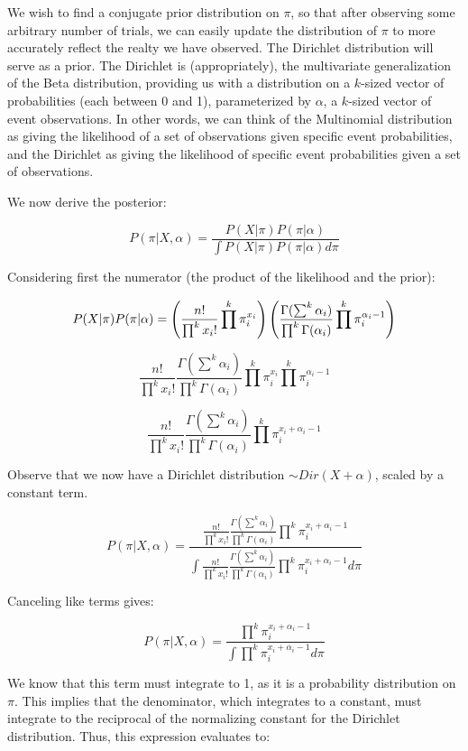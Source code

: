 \documentclass[twoside,11pt]{homework}
\begin{document}
We wish to find a conjugate prior distribution on $\pi$, so that after observing some arbitrary number of trials, we can easily update the distribution of $\pi$ to more accurately reflect the realty we have observed. The Dirichlet distribution will serve as a prior. The Dirichlet is (appropriately), the multivariate generalization of the Beta distribution, providing us with a distribution on a $k$-sized vector of probabilities (each between 0 and 1), parameterized by $\alpha$, a $k$-sized vector of event observations. In other words, we can think of the Multinomial distribution as giving the likelihood of a set of observations given specific event probabilities, and the Dirichlet as giving the likelihood of specific event probabilities given a set of observations.

We now derive the posterior:

\[
P(\pi | X, \alpha) = \frac{P(X|\pi)P(\pi|\alpha)}{\int P(X|\pi)P(\pi|\alpha) d\pi}
\]

Considering first the numerator (the product of the likelihood and the prior):

\[
P(X|\pi)P(\pi|\alpha) = \left(\frac{n!}{\prod^k x_i!}\prod^k \pi_i^{x_i}\right)\left(\frac{\Gamma(\sum^k \alpha_i)}{\prod^k \Gamma(\alpha_i)}\prod^k \pi_i^{\alpha_i - 1}\right)
\]

\[
\frac{n!}{\prod^k x_i!}\frac{\Gamma(\sum^k \alpha_i)}{\prod^k \Gamma(\alpha_i)}\prod^k \pi_i^{x_i}\prod^k \pi_i^{\alpha_i - 1}
\]

\[
\frac{n!}{\prod^k x_i!}\frac{\Gamma(\sum^k \alpha_i)}{\prod^k \Gamma(\alpha_i)}\prod^k \pi_i^{x_i + \alpha_i - 1}
\]

Observe that we now have a Dirichlet distribution $\sim Dir(X + \alpha)$, scaled by a constant term.

\[
P(\pi | X, \alpha) = 
\frac{
\frac{n!}{\prod^k x_i!}\frac{\Gamma(\sum^k \alpha_i)}{\prod^k \Gamma(\alpha_i)}\prod^k \pi_i^{x_i + \alpha_i - 1}
}{
\int \frac{n!}{\prod^k x_i!}\frac{\Gamma(\sum^k \alpha_i)}{\prod^k \Gamma(\alpha_i)}\prod^k \pi_i^{x_i + \alpha_i - 1} d\pi
}
\]

Canceling like terms gives:

\[
P(\pi | X, \alpha) = 
\frac{
\prod^k \pi_i^{x_i + \alpha_i - 1}
}{
\int \prod^k \pi_i^{x_i + \alpha_i - 1} d\pi
}
\]

We know that this term must integrate to 1, as it is a probability distribution on $\pi$.
This implies that the denominator, which integrates to a constant, must integrate to the reciprocal of the normalizing constant
for the Dirichlet distribution. Thus, this expression evaluates to:
\end{document}
